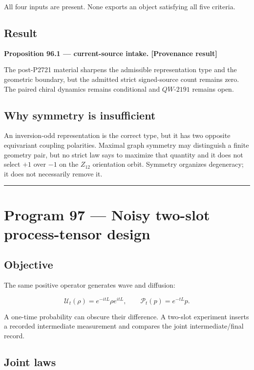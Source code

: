 \documentclass[11pt,a4paper,openany]{report}
\begin{document}
All four inputs are present. None exports an object satisfying all five criteria.

\section{Result}

\textbf{Proposition 96.1 --- current-source intake. [Provenance result]}

The post-P2721 material sharpens the admissible representation type and the geometric boundary, but the admitted strict signed-source count remains zero. The paired chiral dynamics remains conditional and \(QW\text{-}2191\) remains open.

\section{Why symmetry is insufficient}

An inversion-odd representation is the correct type, but it has two opposite equivariant coupling polarities. Maximal graph symmetry may distinguish a finite geometry pair, but no strict law says to maximize that quantity and it does not select \(+1\) over \(-1\) on the \(Z_{12}\) orientation orbit. Symmetry organizes degeneracy; it does not necessarily remove it.

\par\medskip\hrule\medskip

\chapter{Program 97 --- Noisy two-slot process-tensor design}

\section{Objective}

The same positive operator generates wave and diffusion:

\[
\mathcal U_t(\rho)=e^{-itL}\rho e^{itL},
\qquad
\mathcal P_t(p)=e^{-tL}p.
\]

A one-time probability can obscure their difference. A two-slot experiment inserts a recorded intermediate measurement and compares the joint intermediate/\allowbreak{}final record.

\section{Joint laws}
\end{document}
